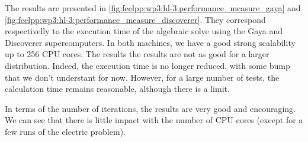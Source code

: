 The results are presented in \cref{fig:feelpp:wp3:hl-3:performance_measure_gaya}
and \cref{fig:feelpp:wp3:hl-3:performance_measure_discoverer}. They correspond
respectivelly to the execution time of the algebraic solve using the Gaya and Discoverer supercomputers.
In both machines, we have a good strong scalability up to 256 CPU cores. The
results
the results are not as good for a larger distribution. Indeed, the execution
time is no longer reduced, with some bump that we don't understant for now.
However, for a large number of tests, the calculation time remains reasonable, although there is a limit.

In terms of the number of iterations, the results are very good and encouraging.
We can see that there is little impact with the number of CPU cores (except for
a few runs of the electric problem).



